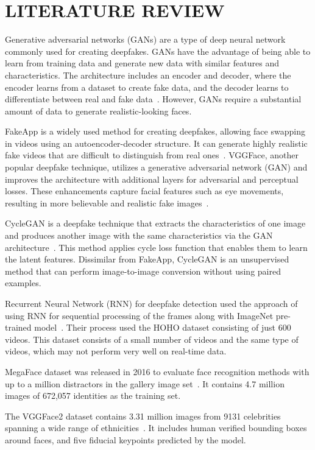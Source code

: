 \section{LITERATURE REVIEW}
Generative adversarial networks (GANs) are a type of deep neural network commonly used for creating deepfakes. GANs have the advantage of being able to learn from training data and generate new data with similar features and characteristics. The architecture includes an encoder and decoder, where the encoder learns from a dataset to create fake data, and the decoder learns to differentiate between real and fake data~\cite{1}. However, GANs require a substantial amount of data to generate realistic-looking faces.

FakeApp is a widely used method for creating deepfakes, allowing face swapping in videos using an autoencoder-decoder structure. It can generate highly realistic fake videos that are difficult to distinguish from real ones~\cite{9}. VGGFace, another popular deepfake technique, utilizes a generative adversarial network (GAN) and improves the architecture with additional layers for adversarial and perceptual losses. These enhancements capture facial features such as eye movements, resulting in more believable and realistic fake images~\cite{vggface}.

CycleGAN is a deepfake technique that extracts the characteristics of one image and produces another image with the same characteristics via the GAN architecture~\cite{cyclegan}. This method applies cycle loss function that enables them to learn the latent features. Dissimilar from FakeApp, CycleGAN is an unsupervised method that can perform image-to-image conversion without using paired examples.

Recurrent Neural Network (RNN) for deepfake detection used the approach of using RNN for sequential processing of the frames along with ImageNet pre-trained model~\cite{rnn_detection}. Their process used the HOHO dataset consisting of just 600 videos. This dataset consists of a small number of videos and the same type of videos, which may not perform very well on real-time data.

MegaFace dataset was released in 2016 to evaluate face recognition methods with up to a million distractors in the gallery image set~\cite{megaface}. It contains 4.7 million images of 672,057 identities as the training set.

The VGGFace2 dataset contains 3.31 million images from 9131 celebrities spanning a wide range of ethnicities~\cite{vggface2}. It includes human verified bounding boxes around faces, and five fiducial keypoints predicted by the model.

